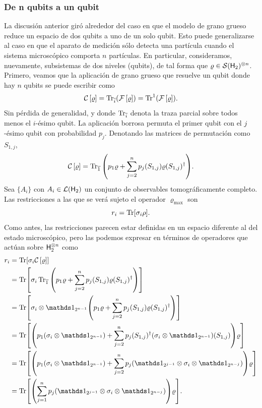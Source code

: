\subsubsection{De n qubits a un qubit}
La discusión anterior giró alrededor del caso en que el modelo de grano grueso reduce un espacio de dos qubits a uno de un solo qubit. Esto puede generalizarse al caso en que el aparato de medición sólo detecta una partícula cuando el sistema microscópico comporta $n$ partículas. En particular, consideramos, nuevamente, subsistemas de dos niveles (qubits), de tal forma que $\varrho\in\mathcal{S}({\sf H}_{2})^{\otimes n}$. Primero, veamos que la aplicación de grano grueso que resuelve un qubit donde hay $n$ qubits se puede escribir como
\begin{equation*}
    \mathcal{C}\left[\varrho\right]=\Tr_{\overline{i}}(\mathcal{F}\left[\varrho\right])=\Tr^{1}(\mathcal{F}\left[\varrho\right]).
\end{equation*}
Sin pérdida de generalidad, y donde $\Tr_{\overline{i}}$ denota la traza parcial sobre todos menos el $i$-ésimo qubit. La aplicación borrosa permuta el primer qubit con el $j$-ésimo qubit con probabilidad $p_{j}$. Denotando las matrices de permutación como $S_{1,j}$,
\begin{equation}\label{eq:CGNto1}
    \mathcal{C}\left[\varrho\right]=\Tr_{\overline{1}}\qty(p_{1}\varrho+\sum_{j=2}^{n}p_{j}(S_{1,j})\varrho(S_{1,j})^{\dagger}).
\end{equation}
Sea $\{A_{i}\}$ con $A_{i}\in\mathcal{L}({\sf H}_{2})$ un conjunto de observables tomográficamente completo. Las restricciones a las que se verá sujeto el operador $\varrho_{\max}$ son
\begin{equation*}
    r_{i}=\Tr[\sigma_{i}\rho].
\end{equation*}
Como antes, las restricciones parecen estar definidas en un espacio diferente al del estado microscópico, pero las podemos expresar en términos de operadores que actúan sobre ${\sf H}_{2}^{\otimes n}$ como
\begin{align*}
    r_{i}&=\Tr[\sigma_{i}\CG{\varrho}]\\
    &=\Tr[\sigma_{i}\Tr_{\overline{1}}\qty(p_{1}\varrho+\sum_{j=2}^{n}p_{j}(S_{1,j})\varrho(S_{1,j})^{\dagger})]\\
    &=\Tr[\sigma_{i}\otimes\Id_{2^{n-1}}\qty(p_{1}\varrho+\sum_{j=2}^{n}p_{j}(S_{1,j})\varrho(S_{1,j})^{\dagger})]\\
    &=\Tr[\qty(p_{1}(\sigma_{i}\otimes\Id_{2^{n-1}})+\sum_{j=2}^{n}p_{j}(S_{1,j})^{\dagger}(\sigma_{i}\otimes\Id_{2^{n-1}})(S_{1,j}))\varrho]\\
    &=\Tr[\qty(p_{1}(\sigma_{i}\otimes\Id_{2^{n-1}})+\sum_{j=2}^{n}p_{j}(\Id_{2^{j-1}}\otimes\sigma_{i}\otimes\Id_{2^{n-j}}))\varrho]\\
    &=\Tr[\qty(\sum_{j=1}^{n}p_{j}(\Id_{2^{j-1}}\otimes\sigma_{i}\otimes\Id_{2^{n-j}}))\varrho].
\end{align*}
